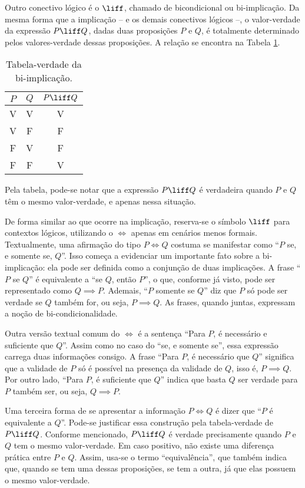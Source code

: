 Outro conectivo lógico é o $\liff$, chamado de bicondicional ou bi-implicação.
Da mesma forma que a implicação -- e os demais conectivos lógicos --, o valor-verdade da expressão $P \liff Q$, dadas duas proposições $P$ e $Q$, é totalmente determinado pelos valores-verdade dessas proposições.
A relação se encontra na Tabela \ref{tbl:bi-implicacao}.

\begin{table}[h]
\caption{Tabela-verdade da bi-implicação.}
\label{tbl:bi-implicacao}
\centering
\begin{tabular}{cc|c}
$P$		& $Q$		& $P \liff Q$	\\ \hline
V		& V			& V			\\
V		& F			& F			\\
F		& V			& F			\\
F		& F			& V			\\	
\end{tabular}
\end{table}
%
\noindent Pela tabela, pode-se notar que a expressão $P \liff Q$ é verdadeira quando $P$ e $Q$ têm o mesmo valor-verdade, e apenas nessa situação.

De forma similar ao que ocorre na implicação, reserva-se o símbolo $\liff$ para contextos lógicos, utilizando o $\iff$ apenas em cenários menos formais.
Textualmente, uma afirmação do tipo $P \iff Q$ costuma se manifestar como ``$P$ se, e somente se, $Q$''. 
Isso começa a evidenciar um importante fato sobre a bi-implicação: ela pode ser definida como a conjunção de duas implicações.
A frase ``$P$ se $Q$'' é equivalente a ``se $Q$, então $P$'', o que, conforme já visto, pode ser representado como $Q \implies P$.
Ademais, ``$P$ somente se $Q$'' diz que $P$ só pode ser verdade se $Q$ também for, ou seja, $P \implies Q$. 
As frases, quando juntas, expressam a noção de bi-condicionalidade.

Outra versão textual comum do $\iff$ é a sentença ``Para $P$, é necessário e suficiente que $Q$''.
Assim como no caso do ``se, e somente se'', essa expressão carrega duas informações consigo.
A frase ``Para $P$, é necessário que $Q$'' significa que a validade de $P$ só é possível na presença da validade de $Q$, isso é, $P \implies Q$.
Por outro lado, ``Para $P$, é suficiente que $Q$'' indica que basta $Q$ ser verdade para $P$ também ser, ou seja, $Q \implies P$.

Uma terceira forma de se apresentar a informação $P \iff Q$ é dizer que ``$P$ é equivalente a $Q$''.
Pode-se justificar essa construção pela tabela-verdade de $P \liff Q$. 
Conforme mencionado, $P \liff Q$ é verdade precisamente quando $P$ e $Q$ tem o mesmo valor-verdade.
Em caso positivo, não existe uma diferença prática entre $P$ e $Q$.
Assim, usa-se o termo ``equivalência'', que também indica que, quando se tem uma dessas proposições, se tem a outra, já que elas possuem o mesmo valor-verdade.

